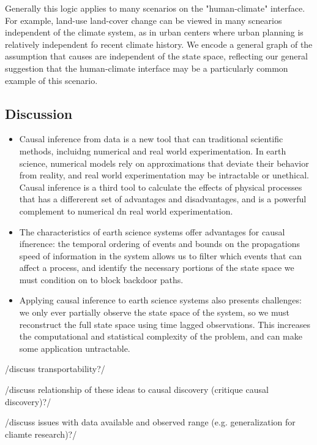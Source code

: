 \documentclass[12pt]{article}
\begin{document}
Generally this logic applies to many scenarios on the
"human-climate" interface. For example, land-use land-cover change
can be viewed in many scnearios independent of the climate system,
as in urban centers where urban planning is relatively independent
fo recent climate history. We encode a general graph of the
assumption that causes are independent of the state space,
reflecting our general suggestion that the human-climate interface
may be a particularly common example of this scenario.

\subsection{Discussion}

\begin{itemize}
\item Causal inference from data is a new tool that can traditional
  scientific methods, incluidng numerical and real world
  experimentation. In earth science, numerical models rely on
  approximations that deviate their behavior from reality, and real
  world experimentation may be intractable or unethical. Causal
  inference is a third tool to calculate the effects of physical
  processes that has a differerent set of advantages and
  disadvantages, and is a powerful complement to numerical dn real
  world experimentation.
\item The characteristics of earth science systems offer advantages
  for causal ifnerence: the temporal ordering of events and bounds on
  the propagations speed of information in the system allows us to
  filter which events that can affect a process, and identify the
  necessary portions of the state space we must condition on to block
  backdoor paths.
\item Applying causal inference to earth science systems also presents
  challenges: we only ever partially observe the state space of the
  system, so we must reconstruct the full state space using time
  lagged observations. This increases the computational and
  statistical complexity of the problem, and can make some application
  untractable.
\end{itemize}

/discuss transportability?/

/discuss relationship of these ideas to causal discovery (critique
causal discovery)?/

/discuss issues with data available and observed range
(e.g. generalization for cliamte research)?/


\end{document}
